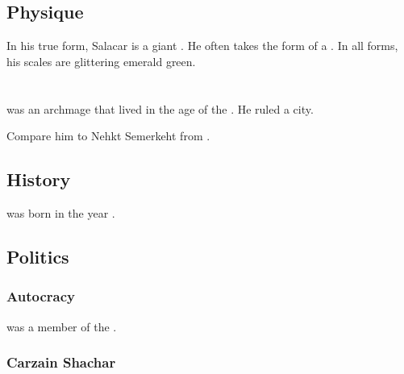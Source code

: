 \subsection{Physique}
In his true form, Salacar is a giant \nagalord. 
He often takes the form of a \scatha. 
In all forms, his scales are glittering emerald green. 















\section{\ZeethanKraal}
\index{\ZeethanKraal}
\ZeethanKraal was an \ophidian archmage that lived in the age of the \thirdbanewar. 
He ruled a city. 

Compare him to Nehkt Semerkeht from \cite{RobertEHoward:NehktSemerkeht}. 









\subsection{History}
\ZeethanKraal was born in the year .









\subsection{Politics}





\subsubsection{\Caisith Autocracy}
\Kraal was a member of the . 





\subsubsection{Carzain Shachar}

